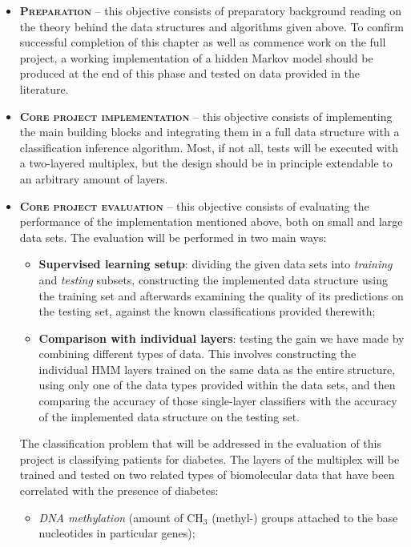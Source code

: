\begin{itemize}
    \item \textbf{\textsc{Preparation}} -- this objective consists of preparatory background reading on the theory behind the data structures and algorithms given above. To confirm successful completion of this chapter as well as commence work on the full project, a working implementation of a hidden Markov model should be produced at the end of this phase and tested on data provided in the literature.
    \item \textbf{\textsc{Core project implementation}} -- this objective consists of implementing the main building blocks and integrating them in a full data structure with a classification inference algorithm. Most, if not all, tests will be executed with a two-layered multiplex, but the design should be in principle extendable to an arbitrary amount of layers.
    \item \textbf{\textsc{Core project evaluation}} -- this objective consists of evaluating the performance of the implementation mentioned above, both on small and large data sets. The evaluation will be performed in two main ways:
    \begin{itemize}
        \item \textbf{Supervised learning setup}: dividing the given data sets into \emph{training} and \emph{testing} subsets, constructing the implemented data structure using the training set and afterwards examining the quality of its predictions on the testing set, against the known classifications provided therewith;
        \item \textbf{Comparison with individual layers}: testing the gain we have made by combining different types of data. This involves constructing the individual HMM layers trained on the same data as the entire structure, using only one of the data types provided within the data sets, and then comparing the accuracy of those single-layer classifiers with the accuracy of the implemented data structure on the testing set.
    \end{itemize}
    The classification problem that will be addressed in the evaluation of this project is classifying patients for diabetes. The layers of the multiplex will be trained and tested on two related types of biomolecular data that have been correlated with the presence of diabetes: 
    \begin{itemize}
        \item \emph{DNA methylation} (amount of $\text{CH}_3$ (methyl-) groups attached to the base nucleotides in particular genes);

\end{itemize}
\end{itemize}
